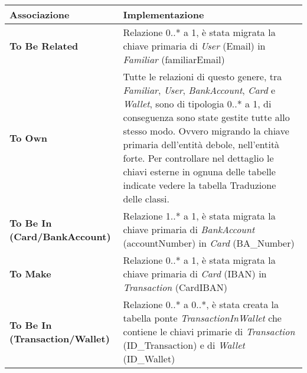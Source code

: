 \begin{longtable}{m{6.7cm}|m{7cm}}

    \rowcolor{black!10}
    \textbf{Associazione} & \textbf{Implementazione} \\ \hline
    \endhead

    \textbf{To Be Related} &
    Relazione 0..* a 1, è stata migrata la chiave primaria di \textit{User} (Email) in \textit{Familiar} (familiarEmail) \\ \hline

    \textbf{To Own} &
    Tutte le relazioni di questo genere, tra \textit{Familiar}, \textit{User}, \textit{BankAccount}, \textit{Card} e \textit{Wallet}, sono di tipologia 0..* a 1,
    di conseguenza sono state gestite tutte allo stesso modo. Ovvero migrando la chiave primaria dell'entità debole, nell'entità forte.
    Per controllare nel dettaglio le chiavi esterne in ognuna delle tabelle indicate vedere la tabella Traduzione delle classi. \\ \hline

    \textbf{To Be In (Card/BankAccount)} &
    Relazione 1..* a 1, è stata migrata la chiave primaria di \textit{BankAccount} (accountNumber) in \textit{Card} (BA\_Number) \\ \hline

    \textbf{To Make} &
    Relazione 0..* a 1, è stata migrata la chiave primaria di \textit{Card} (IBAN) in \textit{Transaction} (CardIBAN) \\ \hline

    \textbf{To Be In (Transaction/Wallet)} &
    Relazione 0..* a 0..*, è stata creata la tabella ponte \textit{TransactionInWallet} che contiene le chiavi primarie di \textit{Transaction} (ID\_Transaction) e di \textit{Wallet} (ID\_Wallet) \\ \hline

\end{longtable}